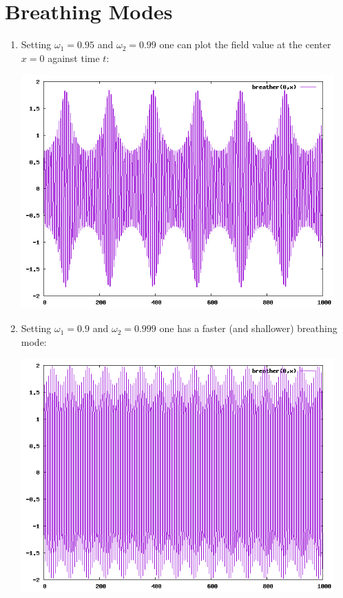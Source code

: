 \documentclass{report}
\begin{document}
\section{Breathing Modes}
\begin{enumerate}
\item
Setting $\omega_1=0.95$ and $\omega_2=0.99$ one can plot the field value at the center $x=0$ against time $t$:
\begin{center}
  \includegraphics[width=12cm]{plot/analytic_plot_95_99.png}
\end{center}
\item Setting $\omega_1=0.9$ and $\omega_2=0.999$ one has a faster (and shallower) breathing mode:
\begin{center}
  \includegraphics[width=12cm]{plot/analytic_plot_9_999.png}
\end{center}
\end{enumerate}
\end{document}
